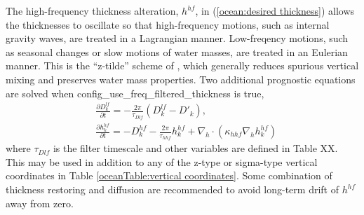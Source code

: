 The high-frequency thickness alteration, $h^{hf}$, in (\ref{ocean:desired thickness}) allows the thicknesses to oscillate so that high-frequency motions, such as internal gravity waves, are treated in a Lagrangian manner.  Low-freqency motions, such as seasonal changes or slow motions of water masses, are treated in an Eulerian manner.  This is the ``z-tilde'' scheme of \citet{Leclair_Madec11om}, which generally reduces spurious vertical mixing and preserves water mass properties.  Two additional prognostic equations are solved when config\_use\_freq\_filtered\_thickness is true,
\begin{eqnarray}
\label{Dlf}
 & \displaystyle
  \frac{\partial D^{lf}_k}{\partial t} = - \frac{2\pi}{\tau_{Dlf}} \left( D^{lf}_k - D'_k \right), 
\\ & \displaystyle
\label{ocean:hhf}
\frac{\partial h^{hf}_k}{\partial t} =  - D^{hf}_k - \frac{2\pi}{\tau_{hhf}} h^{hf}_k + \nabla_h\cdot \left( \kappa_{hhf} \nabla_h h^{hf}_k \right) 
\end{eqnarray}
where $\tau_{Dlf}$ is the filter timescale and other variables are defined in Table XX.  This may be used in addition to any of the z-type or sigma-type vertical coordinates in Table \ref{oceanTable:vertical coordinates}.  Some combination of thickness restoring and diffusion are recommended to avoid long-term drift of $h^{hf}$ away from zero.



